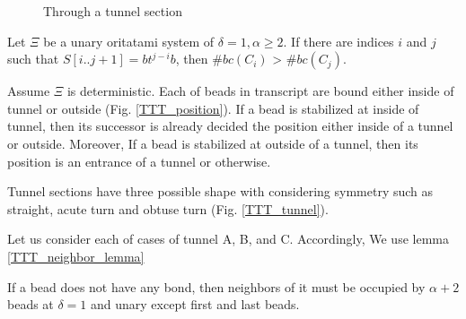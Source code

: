 \documentclass[runningheads]{llncs}
\begin{document}
\begin{figure}
\begin{center}
    \caption{Through a tunnel section}
    \label{TTT_tunnel_intro}
  \end{center}
\end{figure}




\begin{theorem}
Let $\Xi$ be a unary oritatami system of $\delta = 1, \alpha \geq 2$. If there are indices $i$ and $j$ such that $S[i..j+1] = bt^{j-i}b$, then $\#bc(C_i)$ > $\#bc(C_j)$.
\end{theorem}



\proof%
Assume $\Xi$ is deterministic. %
Each of beads in transcript are bound either inside of tunnel or outside (Fig. \ref{TTT_position}). If a bead is stabilized at inside of tunnel, then its successor is already decided the position either inside of a tunnel or outside. Moreover, If a bead is stabilized at outside of a tunnel, then its position is an entrance of a tunnel or otherwise.

Tunnel sections have three possible shape with considering symmetry such as straight, acute turn and obtuse turn (Fig. \ref{TTT_tunnel}). %

Let us consider each of cases of tunnel A, B, and C. Accordingly, We use lemma \ref{TTT_neighbor_lemma}

\begin{lemma}
\label{TTT_neighbor_lemma}
If a bead does not have any bond, then neighbors of it must be occupied by $\alpha + 2$ beads at $\delta = 1$ and unary except first and last beads.
\end{lemma}
\end{document}
